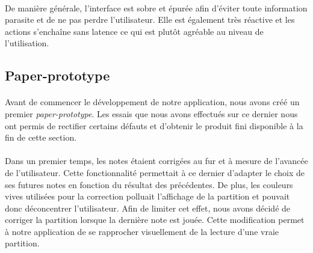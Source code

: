 \documentclass[a4paper, 12pt]{article}
\begin{document}
    \paragraph{}
    De manière générale, l'interface est sobre et épurée afin d'éviter toute information parasite et de ne pas perdre l'utilisateur. Elle est également très réactive et les actions s'enchaîne sans latence ce qui est plutôt agréable au niveau de l'utilisation.
    
    
    \subsection{Paper-prototype}
    \label{subsec:Paper-prototype}
    
    \paragraph{}
    Avant de commencer le développement de notre application, nous avons créé un premier \emph{paper-prototype}. Les essais que nous avons effectués sur ce dernier nous ont permis de rectifier certains défauts et d'obtenir le produit fini disponible à la fin de cette section.
    \paragraph{}
    Dans un premier temps, les notes étaient corrigées au fur et à mesure de l'avancée de l'utilisateur. Cette fonctionnalité permettait à ce dernier d'adapter le choix de ses futures notes en fonction du résultat des précédentes. De plus, les couleurs vives utilisées pour la correction polluait l'affichage de la partition et pouvait donc déconcentrer l'utilisateur. Afin de limiter cet effet, nous avons décidé de corriger la partition lorsque la dernière note est jouée. Cette modification permet à notre application de se rapprocher visuellement de la lecture d'une vraie partition.
    
\end{document}
